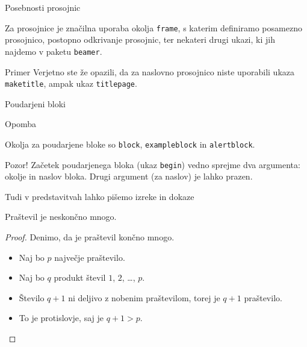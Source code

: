 \begin{frame}{Posebnosti prosojnic}

	Za prosojnice je značilna uporaba okolja \texttt{frame},
	s katerim definiramo posamezno prosojnico,
	postopno odkrivanje prosojnic,
	ter nekateri drugi ukazi, ki jih najdemo v paketu \texttt{beamer}.
	\begin{exampleblock}{Primer}
		Verjetno ste že opazili, da za naslovno prosojnico niste uporabili
		ukaza \texttt{maketitle}, ampak ukaz \texttt{titlepage}.
	\end{exampleblock}
\end{frame}

\begin{frame}{Poudarjeni bloki}
        \begin{block}{Opomba}

		Okolja za poudarjene bloke so \texttt{block}, \texttt{exampleblock} in \texttt{alertblock}.
        \end{block}

		\begin{alertblock}{Pozor!}
        Začetek poudarjenega bloka (ukaz \texttt{begin}) vedno sprejme 
		dva argumenta: okolje in naslov bloka.
		Drugi argument (za naslov) je lahko prazen. 
         \end{alertblock}

\end{frame}

\begin{frame}{Tudi v predstavitvah lahko pišemo izreke in dokaze}

	\begin{izrek}
	   Praštevil je neskončno mnogo.
	\end{izrek}
	\begin{proof}
	   Denimo, da je praštevil končno mnogo.
	   \begin{itemize}[<+->]
		  \item Naj bo \(p\) \alert<4>{največje} praštevilo.
		  \item Naj bo \(q\) produkt števil \(1\), \(2\), \ldots, \(p\).
		  \item Število \(q+1\) ni deljivo z nobenim praštevilom, torej je \(q+1\) praštevilo.
		  \item To je protislovje, saj je \(q+1>p\). \qedhere
	   \end{itemize}
	\end{proof}
 \end{frame}
 

